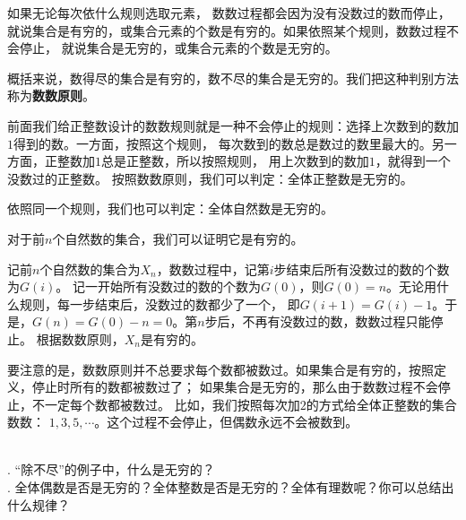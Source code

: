 如果无论每次依什么规则选取元素，
数数过程都会因为没有没数过的数而停止，就说集合是有穷的，或集合元素的个数是有穷的。如果依照某个规则，数数过程不会停止，
就说集合是无穷的，或集合元素的个数是无穷的。

概括来说，数得尽的集合是有穷的，数不尽的集合是无穷的。我们把这种判别方法称为\textbf{数数原则}。

前面我们给正整数设计的数数规则就是一种不会停止的规则：选择上次数到的数加$1$得到的数。一方面，按照这个规则，
每次数到的数总是数过的数里最大的。另一方面，正整数加$1$总是正整数，所以按照规则，
用上次数到的数加$1$，就得到一个没数过的正整数。
按照数数原则，我们可以判定：全体正整数是无穷的。

依照同一个规则，我们也可以判定：全体自然数是无穷的。

对于前$n$个自然数的集合，我们可以证明它是有穷的。

记前$n$个自然数的集合为$X_n$，数数过程中，记第$i$步结束后所有没数过的数的个数为$G(i)$。
记一开始所有没数过的数的个数为$G(0)$，则$G(0) = n$。无论用什么规则，每一步结束后，没数过的数都少了一个，
即$G(i+1) = G(i) - 1$。于是，$G(n) = G(0) - n = 0$。第$n$步后，不再有没数过的数，数数过程只能停止。
根据数数原则，$X_n$是有穷的。

要注意的是，数数原则并不总要求每个数都被数过。如果集合是有穷的，按照定义，停止时所有的数都被数过了；
如果集合是无穷的，那么由于数数过程不会停止，不一定每个数都被数过。
比如，我们按照每次加$2$的方式给全体正整数的集合数数：
$1,3,5,\cdots$。这个过程不会停止，但偶数永远不会被数到。

\begin{sk}
    \mbox{}\\
    . “除不尽”的例子中，什么是无穷的？\\
    . 全体偶数是否是无穷的？全体整数是否是无穷的？全体有理数呢？你可以总结出什么规律？
\end{sk}
